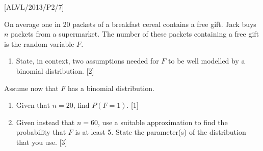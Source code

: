 \item {[}ALVL/2013/P2/7{]}

On average one in 20 packets of a breakfast cereal contains a free
gift. Jack buys $n$ packets from a supermarket. The number of these
packets containing a free gift is the random variable $F$. 
\begin{enumerate}
\item State, in context, two assumptions needed for $F$ to be well modelled
by a binomial distribution. \hfill{}{[}2{]}
\end{enumerate}
Assume now that $F$ has a binomial distribution. 
\begin{enumerate}
\item Given that $n=20$, find $P\left(F=1\right)$. \hfill{} {[}1{]}
\item Given instead that $n=60$, use a suitable approximation to find the
probability that $F$ is at least 5. State the parameter(s) of the
distribution that you use. \hfill{}{[}3{]}
\end{enumerate}

